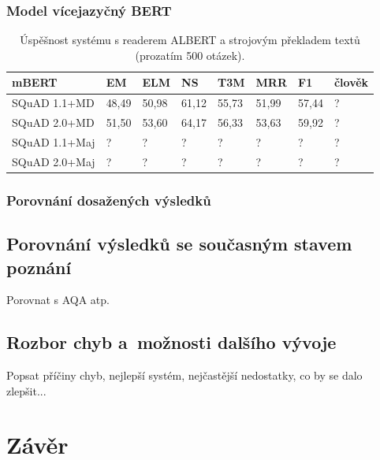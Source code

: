 \subsection{Model vícejazyčný BERT}
\begin{table}[H]
    \centering
    \begin{tabular}{|l|l|l|l|l|l|l|l|}
        \hline
        \textbf{mBERT}  & EM    & ELM   & NS    & T3M   & MRR   & F1        & člověk \\ \hline
        SQuAD 1.1+MD    & 48,49 & 50,98 & 61,12 & 55,73 & 51,99 & 57,44     & ?      \\ \hline
        SQuAD 2.0+MD    & 51,50 & 53,60 & 64,17 & 56,33 & 53,63 & 59,92     & ?      \\ \hline
        SQuAD 1.1+Maj   & ?     & ?     & ?     & ?     & ?     & ?         & ?      \\ \hline
        SQuAD 2.0+Maj   & ?     & ?     & ?     & ?     & ?     & ?         & ?      \\ \hline
    \end{tabular}
    \caption{Úspěšnost systému s readerem ALBERT a strojovým překladem textů (prozatím 500 otázek).}
    \label{tab:system_eval_mbert}
\end{table}

\subsection{Porovnání dosažených výsledků}


\section{Porovnání výsledků se současným stavem poznání}
Porovnat  s AQA atp. \cite{aqa}


\section{Rozbor chyb a~možnosti dalšího vývoje}
Popsat příčiny chyb, nejlepší systém, nejčastější nedostatky, co by se dalo zlepšit...



\chapter{Závěr}
\label{conclusion}


